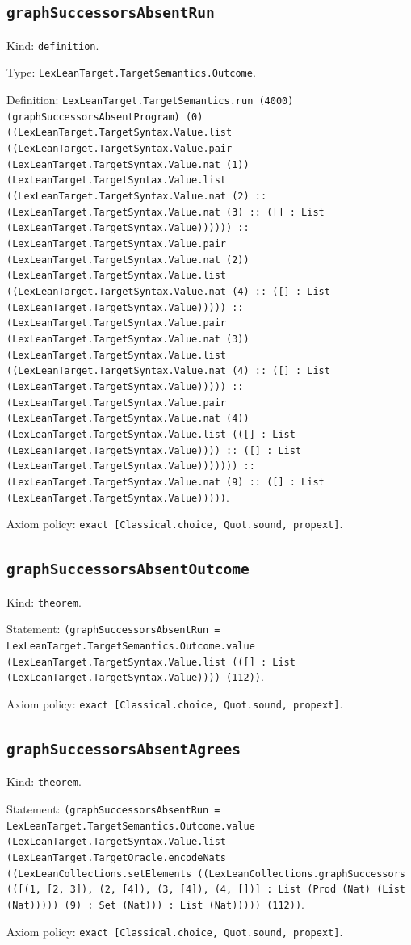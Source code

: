 \documentclass[11pt]{article}
\begin{document}
\subsection*{\texttt{graphSuccessorsAbsentRun}}
\noindent Kind: \texttt{definition}.\par
\noindent Type: \texttt{LexLeanTarget.TargetSemantics.Outcome}.\par
\noindent Definition: \texttt{LexLeanTarget.TargetSemantics.run (4000) (graphSuccessorsAbsentProgram) (0) ((LexLeanTarget.TargetSyntax.Value.list ((LexLeanTarget.TargetSyntax.Value.pair (LexLeanTarget.TargetSyntax.Value.nat (1)) (LexLeanTarget.TargetSyntax.Value.list ((LexLeanTarget.TargetSyntax.Value.nat (2) :: (LexLeanTarget.TargetSyntax.Value.nat (3) :: ([] : List (LexLeanTarget.TargetSyntax.Value)))))) :: (LexLeanTarget.TargetSyntax.Value.pair (LexLeanTarget.TargetSyntax.Value.nat (2)) (LexLeanTarget.TargetSyntax.Value.list ((LexLeanTarget.TargetSyntax.Value.nat (4) :: ([] : List (LexLeanTarget.TargetSyntax.Value))))) :: (LexLeanTarget.TargetSyntax.Value.pair (LexLeanTarget.TargetSyntax.Value.nat (3)) (LexLeanTarget.TargetSyntax.Value.list ((LexLeanTarget.TargetSyntax.Value.nat (4) :: ([] : List (LexLeanTarget.TargetSyntax.Value))))) :: (LexLeanTarget.TargetSyntax.Value.pair (LexLeanTarget.TargetSyntax.Value.nat (4)) (LexLeanTarget.TargetSyntax.Value.list (([] : List (LexLeanTarget.TargetSyntax.Value)))) :: ([] : List (LexLeanTarget.TargetSyntax.Value))))))) :: (LexLeanTarget.TargetSyntax.Value.nat (9) :: ([] : List (LexLeanTarget.TargetSyntax.Value)))))}.\par
\noindent Axiom policy: \texttt{exact [Classical.choice, Quot.sound, propext]}.\par
\subsection*{\texttt{graphSuccessorsAbsentOutcome}}
\noindent Kind: \texttt{theorem}.\par
\noindent Statement: \texttt{(graphSuccessorsAbsentRun = LexLeanTarget.TargetSemantics.Outcome.value (LexLeanTarget.TargetSyntax.Value.list (([] : List (LexLeanTarget.TargetSyntax.Value)))) (112))}.\par
\noindent Axiom policy: \texttt{exact [Classical.choice, Quot.sound, propext]}.\par
\subsection*{\texttt{graphSuccessorsAbsentAgrees}}
\noindent Kind: \texttt{theorem}.\par
\noindent Statement: \texttt{(graphSuccessorsAbsentRun = LexLeanTarget.TargetSemantics.Outcome.value (LexLeanTarget.TargetSyntax.Value.list (LexLeanTarget.TargetOracle.encodeNats ((LexLeanCollections.setElements ((LexLeanCollections.graphSuccessors (([(1, [2, 3]), (2, [4]), (3, [4]), (4, [])] : List (Prod (Nat) (List (Nat))))) (9) : Set (Nat))) : List (Nat))))) (112))}.\par
\noindent Axiom policy: \texttt{exact [Classical.choice, Quot.sound, propext]}.\par
\end{document}
